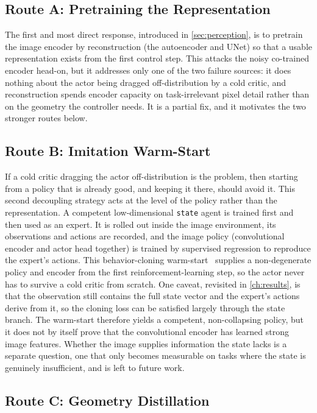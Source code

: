 \subsection{Route A: Pretraining the Representation}

The first and most direct response, introduced in \cref{sec:perception}, is to pretrain the image encoder by reconstruction (the autoencoder and UNet) so that a usable representation exists from the first control step. This attacks the noisy co-trained encoder head-on, but it addresses only one of the two failure sources: it does nothing about the actor being dragged off-distribution by a cold critic, and reconstruction spends encoder capacity on task-irrelevant pixel detail rather than on the geometry the controller needs. It is a partial fix, and it motivates the two stronger routes below.

\subsection{Route B: Imitation Warm-Start}

If a cold critic dragging the actor off-distribution is the problem, then starting from a policy that is already good, and keeping it there, should avoid it. This second decoupling strategy acts at the level of the policy rather than the representation. A competent low-dimensional \texttt{state} agent is trained first and then used as an expert. It is rolled out inside the image environment, its observations and actions are recorded, and the image policy (convolutional encoder and actor head together) is trained by supervised regression to reproduce the expert's actions. This behavior-cloning warm-start~\cite{bojarski2016end} supplies a non-degenerate policy and encoder from the first reinforcement-learning step, so the actor never has to survive a cold critic from scratch. One caveat, revisited in \cref{ch:results}, is that the observation still contains the full state vector and the expert's actions derive from it, so the cloning loss can be satisfied largely through the state branch. The warm-start therefore yields a competent, non-collapsing policy, but it does not by itself prove that the convolutional encoder has learned strong image features. Whether the image supplies information the state lacks is a separate question, one that only becomes measurable on tasks where the state is genuinely insufficient, and is left to future work.

\subsection{Route C: Geometry Distillation}

